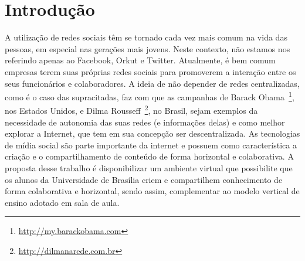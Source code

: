 \chapter{Introdução}

A utilização de redes sociais têm se tornado cada vez mais comum na vida das pessoas, em especial nas gerações mais jovens. Neste contexto, não estamos nos referindo apenas ao Facebook, Orkut e Twitter. Atualmente, é bem comum empresas terem suas próprias redes sociais para promoverem a interação entre os seus funcionários e colaboradores. A ideia de não depender de redes centralizadas, como é o caso das supracitadas, faz com que as campanhas de Barack Obama~\footnote{\url{http://my.barackobama.com}}, nos Estados Unidos, e Dilma Rousseff~\footnote{\url{http://dilmanarede.com.br}}, no Brasil, sejam exemplos da necessidade de autonomia das suas redes (e informações delas) e como melhor explorar a Internet, que tem em sua concepção ser descentralizada. As tecnologias de mídia social são parte importante da internet e possuem como característica a criação e o compartilhamento de conteúdo de forma horizontal e colaborativa. A proposta desse trabalho é disponibilizar um ambiente virtual que possibilite que os alunos da Universidade de Brasília criem e compartilhem conhecimento de forma colaborativa e horizontal, sendo assim, complementar ao modelo vertical de ensino adotado em sala de aula.

